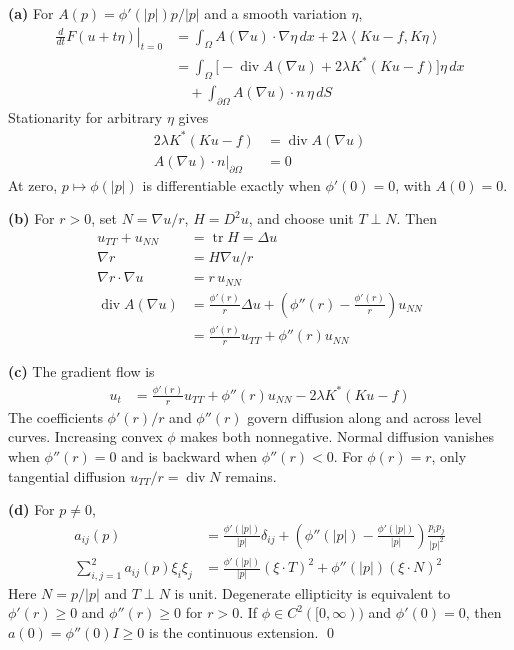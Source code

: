 \documentclass[12pt,letterpaper]{article}
\newcommand{\diver}{\operatorname{div}}
\newcommand{\dx}{\,dx}
\newcommand{\ip}[2]{\left\langle #1,#2\right\rangle}
\newcommand{\partlabel}[1]{\par\medskip\noindent\textbf{(#1)}\enspace}
\newcommand{\finish}{\qed\par}
\begin{document}
\partlabel{a} For $A(p)=\phi'(|p|)p/|p|$ and a smooth variation $\eta$,
\begin{align*}
 \left.\frac{d}{dt}F(u+t\eta)\right|_{t=0}
 &=\int_\Omega A(\nabla u)\cdot\nabla\eta\dx
   +2\lambda\ip{Ku-f}{K\eta}\\
 &=\int_\Omega\bigl[-\diver A(\nabla u)
   +2\lambda K^*(Ku-f)\bigr]\eta\dx\\
 &\quad+\int_{\partial\Omega}A(\nabla u)\cdot n\,\eta\,dS
\end{align*}
Stationarity for arbitrary $\eta$ gives
\begin{align*}
 2\lambda K^*(Ku-f)&=\diver A(\nabla u)\\
 \left.A(\nabla u)\cdot n\right|_{\partial\Omega}&=0
\end{align*}
At zero, $p\mapsto\phi(|p|)$ is differentiable exactly when
$\phi'(0)=0$, with $A(0)=0$.

\partlabel{b} For $r>0$, set $N=\nabla u/r$, $H=D^2u$, and choose
unit $T\perp N$. Then
\begin{align*}
 u_{TT}+u_{NN}&=\operatorname{tr}H=\Delta u\\
 \nabla r&=H\nabla u/r\\
 \nabla r\cdot\nabla u&=r\,u_{NN}\\
 \diver A(\nabla u)
 &=\frac{\phi'(r)}r\Delta u
   +\left(\phi''(r)-\frac{\phi'(r)}r\right)u_{NN}\\
 &=\frac{\phi'(r)}r u_{TT}+\phi''(r)u_{NN}
\end{align*}

\partlabel{c} The gradient flow is
\begin{align*}
 u_t&=\frac{\phi'(r)}r u_{TT}+\phi''(r)u_{NN}
        -2\lambda K^*(Ku-f)
\end{align*}
The coefficients $\phi'(r)/r$ and $\phi''(r)$ govern diffusion
along and across level curves. Increasing convex $\phi$ makes both
nonnegative. Normal diffusion vanishes when $\phi''(r)=0$ and is
backward when $\phi''(r)<0$. For $\phi(r)=r$, only tangential
diffusion $u_{TT}/r=\diver N$ remains.

\partlabel{d} For $p\ne0$,
\begin{align*}
 a_{ij}(p)&=\frac{\phi'(|p|)}{|p|}\delta_{ij}
 +\left(\phi''(|p|)-\frac{\phi'(|p|)}{|p|}\right)
       \frac{p_ip_j}{|p|^2}\\
 \sum_{i,j=1}^2a_{ij}(p)\xi_i\xi_j
 &=\frac{\phi'(|p|)}{|p|}(\xi\cdot T)^2
   +\phi''(|p|)(\xi\cdot N)^2
\end{align*}
Here $N=p/|p|$ and $T\perp N$ is unit. Degenerate ellipticity
is equivalent to $\phi'(r)\geq0$ and $\phi''(r)\geq0$ for $r>0$.
If $\phi\in C^2([0,\infty))$ and $\phi'(0)=0$, then
$a(0)=\phi''(0)I\geq0$ is the continuous extension.
\finish
\end{document}
